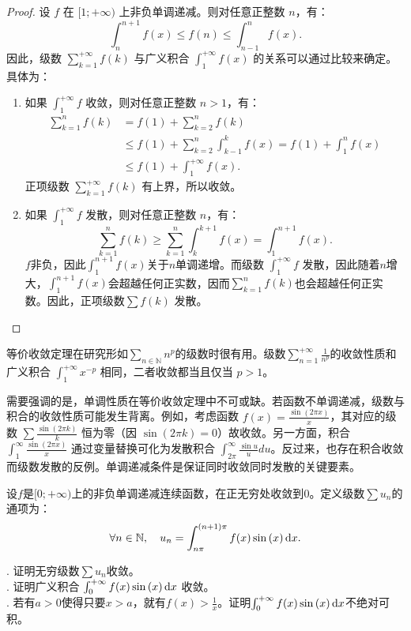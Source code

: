 \documentclass[12pt,UTF8]{ctexbook}
\begin{document}
\begin{proof}
    设 $f$ 在 $[1;+\infty)$ 上非负单调递减。则对任意正整数 $n$，有：
    \[
    \int_{n}^{n+1} f(x) \leqslant f(n) \leqslant \int_{n-1}^{n} f(x).
    \]
    因此，级数 $\sum_{k=1}^{+\infty} f(k)$ 与广义积合 $\int_{1}^{+\infty} f(x)$ 的关系可以通过比较来确定。具体为：
    \begin{enumerate}
        \item 如果 $\int_{1}^{+\infty} f$ 收敛，则对任意正整数 $n>1$，有：
        \begin{align*}
            \sum_{k=1}^{n} f(k) &= f(1) + \sum_{k=2}^{n} f(k)  \\
            &\leqslant  f(1) +\sum_{k=2}^{n} \int_{k-1}^{k} f(x) =  f(1) +\int_{1}^{n} f(x) \\
            &\leqslant  f(1) +\int_{1}^{+\infty} f(x).
        \end{align*}
        正项级数 $\sum_{k=1}^{+\infty} f(k)$ 有上界，所以收敛。

        \item 如果 $\int_{1}^{+\infty} f$ 发散，则对任意正整数 $n$，有：
        \[
        \sum_{k=1}^{n} f(k) \geqslant \sum_{k=1}^{n} \int_{k}^{k+1} f(x) = \int_{1}^{n+1} f(x) .
        \]
        $f$非负，因此$\int_{1}^{n+1} f(x) $关于$n$单调递增。而级数 $\int_{1}^{+\infty} f$ 发散，因此随着$n$增大，$\int_{1}^{n+1} f(x) $会超越任何正实数，因而$\sum_{k=1}^{n} f(k)$也会超越任何正实数。因此，正项级数$\sum f(k)$ 发散。
    \end{enumerate}
\end{proof}

等价收敛定理在研究形如$\displaystyle\sum_{n\in\mathbb{N}}n^p$的级数时很有用。级数$\displaystyle\sum_{n=1}^{+\infty} \frac{1}{n^{p}}$的收敛性质和广义积合 $\int_1^{+\infty} x^{-p} $ 相同，二者收敛都当且仅当 $p>1$。

需要强调的是，单调性质在等价收敛定理中不可或缺。若函数不单调递减，级数与积合的收敛性质可能发生背离。例如，考虑函数 $f(x) = \frac{\sin(2\pi x)}{x}$，其对应的级数 $\sum \frac{\sin(2\pi k)}{k}$ 恒为零（因 $\sin(2\pi k)=0$）故收敛。另一方面，积合 $\int_1^\infty \frac{\sin(2\pi x)}{x}$ 通过变量替换可化为发散积合 $\int_{2\pi}^\infty \frac{\sin u}{u}  du$。反过来，也存在积合收敛而级数发散的反例。单调递减条件是保证同时收敛同时发散的关键要素。

\begin{et}
    设$f$是$[0;+\infty)$上的非负单调递减连续函数，在正无穷处收敛到$0$。定义级数$\sum u_n$的通项为：
    $$ \forall n\in \mathbb{N}, \quad u_n = \int_{n\pi}^{(n+1)\pi} f(x) \sin{(x)} \,\mathrm{d}x. $$
    
    . 证明无穷级数$\sum u_n$收敛。\\
    . 证明广义积合 $\int_0^{+\infty} f(x) \sin{(x)} \,\mathrm{d}x$ 收敛。\\
    . 若有$a>0$使得只要$x > a$，就有$\displaystyle f(x) > \frac{1}{x}$。证明$\int_0^{+\infty} f(x) \sin{(x)} \,\mathrm{d}x$不绝对可积。
\end{et}
\end{document}
